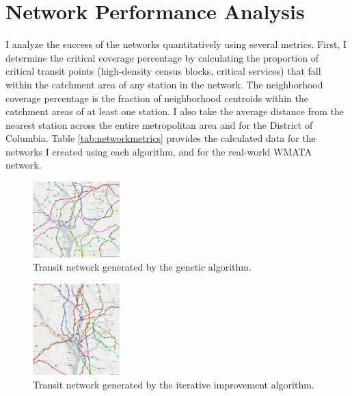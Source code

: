 \documentclass[sigconf,nonacm]{acmart}
\begin{document}
\section{Network Performance Analysis}

I analyze the success of the networks quantitatively using several metrics. First, I determine the critical coverage percentage by calculating the proportion of critical transit points (high-density census blocks, critical services) that fall within the catchment area of any station in the network. The neighborhood coverage percentage is the fraction of neighborhood centroids within the catchment areas of at least one station. I also take the average distance from the nearest station across the entire metropolitan area and for the District of Columbia. Table \ref{tab:networkmetrics} provides the calculated data for the networks I created using each algorithm, and for the real-world WMATA network.

\begin{figure}[ht]
    \centering
    \includegraphics[width=0.3\textwidth]{./img/gen.png}
    \caption{Transit network generated by the genetic algorithm.}
    \label{fig:genetic_network}
\end{figure}

\begin{figure}[ht]
    \centering
    \includegraphics[width=0.3\textwidth]{./img/iter.png}
    \caption{Transit network generated by the iterative improvement algorithm.}
    \label{fig:iterative_network}
\end{figure}
\end{document}
